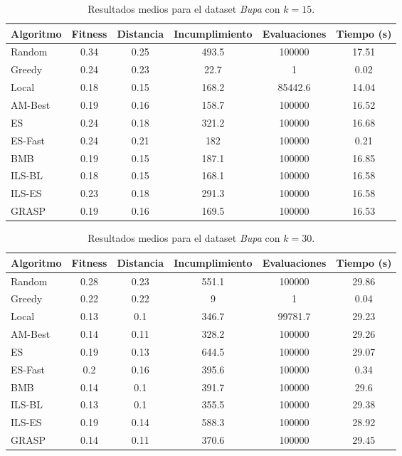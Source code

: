 \documentclass[a4paper,12pt]{article}%
\begin{document}
\begin{table}[H]
	\centering
	\begin{tabular}{|l|ccccc|}
		\hline
		Algoritmo & Fitness & Distancia & Incumplimiento & Evaluaciones & Tiempo (s) \\
		\hline
		Random   & 0.34 & 0.25 & 493.5 & 100000 & 17.51 \\
		Greedy   & 0.24 & 0.23 & 22.7  & 1      & 0.02 \\
		Local    & 0.18 & 0.15 & 168.2 & 85442.6 & 14.04 \\
		AM-Best  & 0.19 & 0.16 & 158.7 & 100000 & 16.52 \\
		ES       & 0.24 & 0.18 & 321.2 & 100000 & 16.68 \\
		ES-Fast  & 0.24 & 0.21 & 182   & 100000 & 0.21 \\
		BMB      & 0.19 & 0.15 & 187.1 & 100000 & 16.85 \\
		ILS-BL   & 0.18 & 0.15 & 168.1 & 100000 & 16.58 \\
		ILS-ES   & 0.23 & 0.18 & 291.3 & 100000 & 16.58 \\
		GRASP    & 0.19 & 0.16 & 169.5 & 100000 & 16.53 \\
		\hline
	\end{tabular}
	\caption{Resultados medios para el dataset \textit{Bupa} con $k=15$.}
	\label{tab_bupa15}
\end{table}

\begin{table}[H]
	\centering
	\begin{tabular}{|l|ccccc|}
		\hline
		Algoritmo & Fitness & Distancia & Incumplimiento & Evaluaciones & Tiempo (s) \\
		\hline
		Random   & 0.28 & 0.23 & 551.1 & 100000 & 29.86 \\
		Greedy   & 0.22 & 0.22 & 9     & 1      & 0.04 \\
		Local    & 0.13 & 0.1  & 346.7 & 99781.7 & 29.23 \\
		AM-Best  & 0.14 & 0.11 & 328.2 & 100000 & 29.26 \\
		ES       & 0.19 & 0.13 & 644.5 & 100000 & 29.07 \\
		ES-Fast  & 0.2  & 0.16 & 395.6 & 100000 & 0.34 \\
		BMB      & 0.14 & 0.1  & 391.7 & 100000 & 29.6 \\
		ILS-BL   & 0.13 & 0.1  & 355.5 & 100000 & 29.38 \\
		ILS-ES   & 0.19 & 0.14 & 588.3 & 100000 & 28.92 \\
		GRASP    & 0.14 & 0.11 & 370.6 & 100000 & 29.45 \\
		\hline
	\end{tabular}
	\caption{Resultados medios para el dataset \textit{Bupa} con $k=30$.}
	\label{tab_bupa30}
\end{table}
\end{document}
